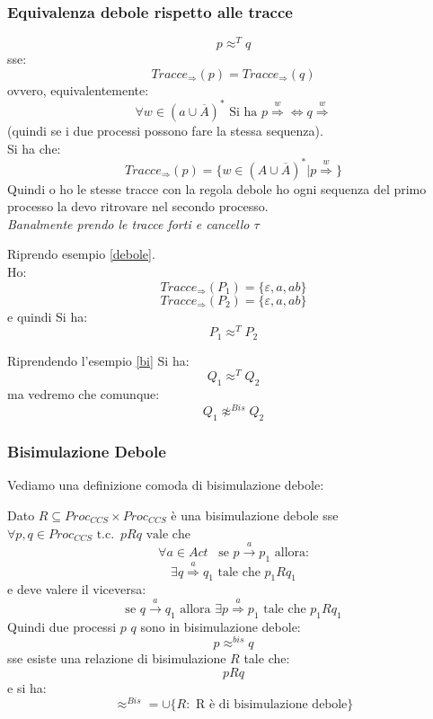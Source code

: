 \subsubsection{Equivalenza debole rispetto alle tracce}
\begin{definizione}
  \[p\approx^T q\]
  sse:
  \[Tracce_{\Rightarrow}(p)=Tracce_{\Rightarrow}(q)\]
  ovvero, equivalentemente:
  \[\forall w\in(a\cup \overline{A})^*\mbox{ Si ha }p\stackrel{w}{\Rightarrow}
    \iff q\stackrel{w}{\Rightarrow}\]
  (quindi se i due processi possono fare la stessa sequenza).\\
  Si ha che:
  \[Tracce_{\Rightarrow}(p)=\{w\in(A\cup \overline{A})^*|
    p\stackrel{w}{\Rightarrow}\}\]
  Quindi o ho le stesse tracce con la regola debole ho ogni sequenza del primo
  processo la devo ritrovare nel secondo processo.\\
  \textit{Banalmente prendo le tracce forti e cancello $\tau$}
\end{definizione} \vspace{5mm} %
\begin{esempio}
  Riprendo esempio \ref{debole}.\\
  Ho:
  \[Tracce_{\Rightarrow}(P_1)=\{\varepsilon, a, ab\}\]
  \[Tracce_{\Rightarrow}(P_2)=\{\varepsilon, a, ab\}\]
  e quindi Si ha:
  \[P_1\approx^T P_2\]
\end{esempio}
\begin{esempio}
  Riprendendo l'esempio \ref{bi} Si ha:
  \[Q_1\approx^T Q_2\]
  ma vedremo che comunque:
  \[Q_1\not\approx^{Bis} Q_2\]
\end{esempio}
\subsubsection{Bisimulazione Debole}
Vediamo una definizione comoda di bisimulazione debole:
\begin{definizione}
  Dato $R\subseteq Proc_{CCS}\times Proc_{CCS}$ è una bisimulazione debole sse $\forall p, q\in Proc_{CCS}\mbox{ t.c. }\, pRq \mbox{ vale che }$ 
  \[\forall a\in
    Act\,\,\,\,\,\mbox{se }p\stackrel{a}{\rightarrow}p_1\mbox{ allora:} \] \[\exists
    q\stackrel{a}{\Rightarrow}q_1 \mbox{ tale che } p_1Rq_1\]
  e deve valere il viceversa:
  \[\mbox{se }q\stackrel{a}{\rightarrow}q_1\mbox{ allora }\exists
    p\stackrel{a}{\Rightarrow}p_1 \mbox{ tale che } p_1Rq_1\]
  Quindi due processi $p$ $q$ sono in bisimulazione debole:
  \[p\approx^{bis} q\] sse esiste una relazione di bisimulazione $R$ tale che:
  \[pRq\]
  e si ha:
  \[\approx^{Bis}=\cup\{R:\mbox{ R è di bisimulazione debole}\}\]
\end{definizione} \vspace{5mm} %
